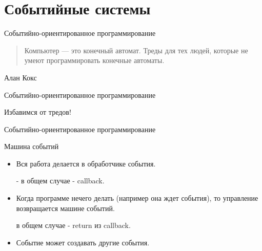 \documentclass[aspectratio=169]{beamer}
\begin{document}
\section{Событийные системы}

\begin{frame}{Событийно-ориентированное программирование}

    \begin{quote}
    Компьютер — это конечный автомат.
        Треды для тех людей, которые не умеют
        программировать конечные автоматы.
    \end{quote}
    \begin{center}
        \begin{uncoverenv}
        Алан Кокс
        \end{uncoverenv}
    \end{center}

\end{frame}

\begin{frame}{Событийно-ориентированное программирование}
    \begin{block}
        {\huge Избавимся от тредов!}
    \end{block}
\end{frame}

\begin{frame}{Событийно-ориентированное программирование}
    \begin{block}{Машина событий}
        \begin{itemize}

            \pause\item Вся работа делается в обработчике события.
                \pause\par - в общем случае - callback.

            \pause\item Когда программе нечего делать (например
                она ждет события), то управление возвращается
                машине событий.
                    \pause\par в общем случае - return из callback.

            \pause\item Событие может создавать другие события.

        \end{itemize}

    \end{block}
\end{frame}
\end{document}
